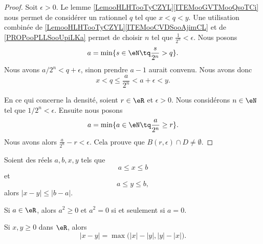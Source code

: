 \begin{proof}
	Soit \( \epsilon>0\). Le lemme \ref{LemooHLHTooTyCZYL}\ref{ITEMooGVTMooQsoTCi} nous permet de considérer un rationnel \( q\) tel que \( x<q<y\). Une utilisation combinée de \ref{LemooHLHTooTyCZYL}\ref{ITEMooCVDSooAjimCL} et de \ref{PROPooPLLSooUpiLKa} permet de choisir \( n\) tel que \( \frac{1}{ 2^n}<\epsilon\). Nous posons
	\begin{equation}
		a=\min\{ s\in \eN\tq \frac{ s }{ 2^n }>q \}.
	\end{equation}
	Nous avons \( a/2^n<q+\epsilon\), sinon prendre \( a-1\) aurait convenu. Nous avons donc
	\begin{equation}
		x<q\leq \frac{ a }{ 2^n }<a+\epsilon<y.
	\end{equation}

	En ce qui concerne la densité, soient \( r\in \eR\) et \( \epsilon>0\). Nous considérons \( n\in \eN\) tel que \( 1/2^n<\epsilon\). Ensuite nous posons
	\begin{equation}
		a=\min\{ a\in \eN\tq \frac{ a }{ 2^n }\geq r \}.
	\end{equation}
	Nous avons alors \( \frac{ a }{ 2^n }-r<\epsilon\). Cela prouve que \( B(r,\epsilon)\cap D\neq\emptyset\).
\end{proof}


\begin{lemma}        \label{LEMooEGYLooCGrDrl}
	Soient des réels \( a,b,x,y\) tels que
	\begin{equation}
		a\leq x\leq b
	\end{equation}
	et
	\begin{equation}
		a\leq y\leq b,
	\end{equation}
	alors \( | x-y |\leq | b-a |\).
\end{lemma}


\begin{lemma}       \label{LEMooNLGSooSGdvAo}
	Si \( a\in \eR\), alors \( a^2\geq 0\) et \( a^2=0\) si et seulement si \( a=0\).
\end{lemma}


\begin{proposition}	\label{PROPooRJOWooGbieCA}
	Si \( x,y\geq 0\) dans \( \eR\), alors
	\begin{equation}
		| x-y |=\max\big( | x |-| y |,| y |-| x | \big).
	\end{equation}
\end{proposition}


